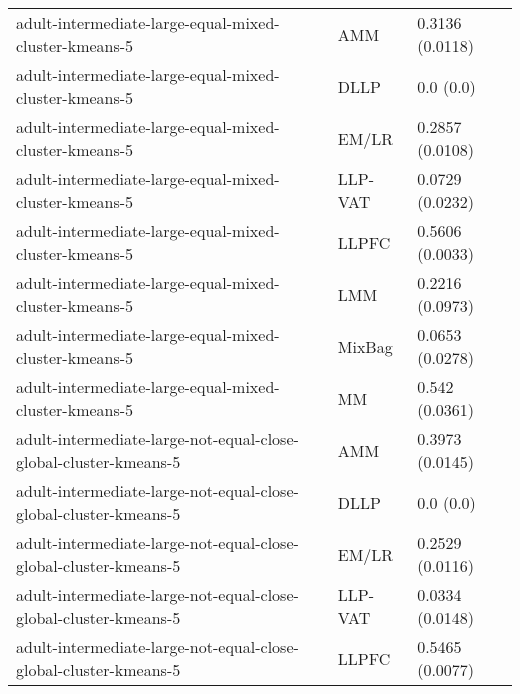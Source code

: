 \begin{longtable}{lll}
                                                        adult-intermediate-large-equal-mixed-cluster-kmeans-5 &       AMM &                           0.3136 (0.0118) \\
                                                        adult-intermediate-large-equal-mixed-cluster-kmeans-5 &      DLLP &                                 0.0 (0.0) \\
                                                        adult-intermediate-large-equal-mixed-cluster-kmeans-5 &     EM/LR &                           0.2857 (0.0108) \\
                                                        adult-intermediate-large-equal-mixed-cluster-kmeans-5 &   LLP-VAT &                           0.0729 (0.0232) \\
                                                        adult-intermediate-large-equal-mixed-cluster-kmeans-5 &     LLPFC &                           0.5606 (0.0033) \\
                                                        adult-intermediate-large-equal-mixed-cluster-kmeans-5 &       LMM &                           0.2216 (0.0973) \\
                                                        adult-intermediate-large-equal-mixed-cluster-kmeans-5 &    MixBag &                           0.0653 (0.0278) \\
                                                        adult-intermediate-large-equal-mixed-cluster-kmeans-5 &        MM &                            0.542 (0.0361) \\
                                             adult-intermediate-large-not-equal-close-global-cluster-kmeans-5 &       AMM &                           0.3973 (0.0145) \\
                                             adult-intermediate-large-not-equal-close-global-cluster-kmeans-5 &      DLLP &                                 0.0 (0.0) \\
                                             adult-intermediate-large-not-equal-close-global-cluster-kmeans-5 &     EM/LR &                           0.2529 (0.0116) \\
                                             adult-intermediate-large-not-equal-close-global-cluster-kmeans-5 &   LLP-VAT &                           0.0334 (0.0148) \\
                                             adult-intermediate-large-not-equal-close-global-cluster-kmeans-5 &     LLPFC &                           0.5465 (0.0077) \\

\end{longtable}
